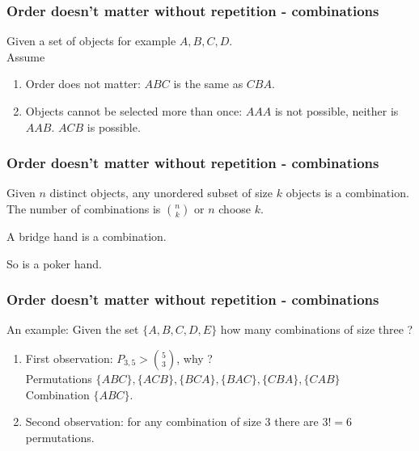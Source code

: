 \begin{frame}[fragile]\frametitle{Order doesn't matter without repetition -
    combinations}

Given a set of objects for example $A,B,C,D$. \\
 
Assume
\begin{enumerate}

\item Order does not matter: $ABC$ is the same as $CBA$.

\item Objects cannot be selected more than once: $AAA$ is not possible,
neither is $AAB$. $ACB$ is possible.

\end{enumerate}
\end{frame}


\begin{frame}[fragile]\frametitle{Order doesn't matter without repetition - combinations}

\begin{defn}
Given $n$ distinct objects, any unordered subset of size 
$k$ objects is a combination. The number of combinations
is $\binom{n}{k}$ or $n$ choose $k$. 
\end{defn}
\vspace{.1in}

A bridge hand is a combination. \\ 

\vspace{.1in}

So is a poker hand.
\end{frame}


\begin{frame}[fragile]\frametitle{Order doesn't matter without repetition - combinations}

An example: Given the set $\{A,B,C,D,E\}$ how many combinations of
size three ?  

\vspace{.1in}

\begin{enumerate}

\item First observation: $P_{3,5} > \binom{5}{3}$, why ? \\ 
Permutations $\{ABC\},\{ACB\},\{BCA\},\{BAC\},\{CBA\},\{CAB\}$\\ 
Combination $\{ABC\}$.   

\item Second observation: for any combination of size $3$ there are 
$3!=6$ permutations.  

\end{enumerate}
\end{frame}


